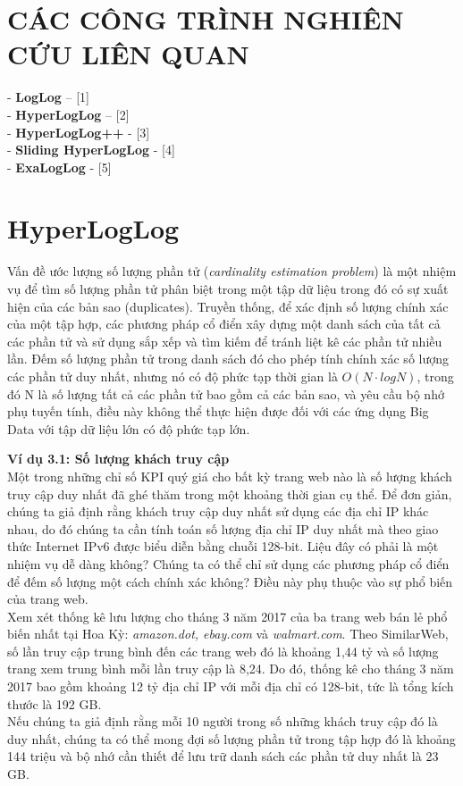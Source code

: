\documentclass[a4paper,13pt]{article}
\theoremstyle{mytheor}
\begin{document}
\section{CÁC CÔNG TRÌNH NGHIÊN CỨU LIÊN QUAN }
- \textbf{LogLog} – [1] \\
- \textbf{HyperLogLog} – [2]\\
- \textbf{HyperLogLog++} - [3] \\
- \textbf{Sliding HyperLogLog} - [4]\\
- \textbf{ExaLogLog} - [5] \\

\section{HyperLogLog}
Vấn đề ước lượng số lượng phần tử (\textit{cardinality estimation problem}) là một nhiệm vụ để tìm số lượng phần tử phân biệt 
trong một tập dữ liệu trong đó có sự xuất hiện của các bản sao (duplicates). Truyền thống, 
để xác định số lượng chính xác của một tập hợp, các phương pháp cổ điển xây dựng 
một danh sách của tất cả các phần tử và sử dụng sắp xếp và tìm kiếm để tránh liệt kê 
các phần tử nhiều lần. Đếm số lượng phần tử trong danh sách đó cho phép tính chính xác 
số lượng các phần tử duy nhất, nhưng nó có độ phức tạp thời gian là $O(N\cdot logN)$, 
trong đó N là số lượng tất cả các phần tử bao gồm cả các bản sao, và yêu cầu 
bộ nhớ phụ tuyến tính, điều này không thể thực hiện được đối với các ứng dụng 
Big Data với tập dữ liệu lớn có độ phức tạp lớn.
\begin{mdframed}
   \textbf{Ví dụ 3.1: Số lượng khách truy cập}\\
    Một trong những chỉ số KPI quý giá cho bất kỳ trang web nào là số lượng khách truy cập duy nhất đã ghé thăm trong một khoảng thời gian cụ thể. 
    Để đơn giản, chúng ta giả định rằng khách truy cập duy nhất sử dụng các địa chỉ IP khác nhau, do đó chúng ta cần tính toán số lượng địa chỉ IP 
    duy nhất mà theo giao thức Internet IPv6 được biểu diễn bằng chuỗi 128-bit. Liệu đây có phải là một nhiệm vụ dễ dàng không? 
    Chúng ta có thể chỉ sử dụng các phương pháp cổ điển để đếm số lượng một cách chính xác không? Điều này phụ thuộc vào sự phổ biến của trang web.\\
    Xem xét thống kê lưu lượng cho tháng 3 năm 2017 của ba trang web bán lẻ phổ biến nhất tại Hoa Kỳ: \textit{amazon.dot, ebay.com} và 
    \textit{walmart.com}. Theo SimilarWeb, số lần truy cập trung bình đến các trang web đó là khoảng 1,44 tỷ và số lượng trang xem trung bình 
    mỗi lần truy cập là 8,24. Do đó, thống kê cho tháng 3 năm 2017 bao gồm khoảng 12 tỷ địa chỉ IP với mỗi địa chỉ có 128-bit, tức là tổng 
    kích thước là 192 GB.\\
    Nếu chúng ta giả định rằng mỗi 10 người trong số những khách truy cập đó là duy nhất, chúng ta có thể mong đợi số lượng phần tử 
    trong tập hợp đó là khoảng 144 triệu và bộ nhớ cần thiết để lưu trữ danh sách các phần tử duy nhất là 23 GB.
\end{mdframed}
\end{document}
